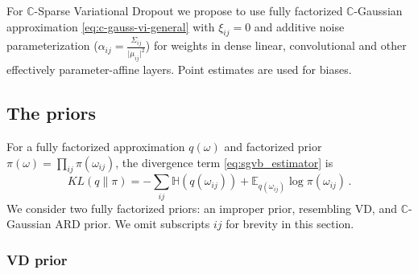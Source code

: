 \documentclass{article}
\newcommand{\cplx}{\mathbb{C}}
\begin{document}
For $\cplx$-Sparse Variational Dropout we propose to use fully factorized $\cplx$-Gaussian
approximation \eqref{eq:c-gauss-vi-general} with $\xi_{ij} = 0$ and additive noise
parameterization ($
  \alpha_{ij} = \tfrac{\Sigma_{ij}}{\lvert \mu_{ij} \rvert^2}
$) for weights in dense linear, convolutional and other effectively parameter-affine
layers. Point estimates are used for biases.


\subsection{The priors} %
\label{sub:the_priors}

For a fully factorized approximation $q(\omega)$ and factorized prior $
  \pi(\omega) = \prod_{ij} \pi(\omega_{ij})
$, the divergence term \eqref{eq:sgvb_estimator} is
\begin{equation}  \label{eq:elbo-general-kl-div}
  KL(q \| \pi)
    = - \sum_{ij}
        \mathbb{H}(q(\omega_{ij}))
        + \mathbb{E}_{q(\omega_{ij})} \log{\pi(\omega_{ij})}
    \,.
\end{equation}
We consider two fully factorized priors: an improper prior, resembling VD, and $\cplx$-Gaussian
ARD prior. We omit subscripts ${ij}$ for brevity in this section.

\subsubsection{VD prior} %
\label{ssub:vd_prior}
\end{document}
